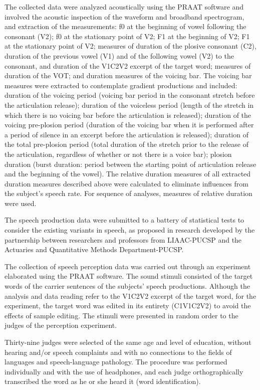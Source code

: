 The collected data were analyzed acoustically using the PRAAT software and
involved the acoustic inspection of the waveform and broadband spectrogram, and
extraction of the measurements: f0 at the beginning of vowel following the
consonant (V2); f0 at the stationary point of V2; F1 at the beginning of V2; F1
at the stationary point of V2; measures of duration of the plosive consonant
(C2), duration of the previous vowel (V1) and of the following vowel (V2) to
the consonant, and duration of the V1C2V2 excerpt of the target word; measures
of duration of the VOT; and duration measures of the voicing bar. The voicing
bar measures were extracted to contemplate gradient productions and included:
duration of the voicing period (voicing bar period in the consonant stretch
before the articulation release); duration of the voiceless period (length of
the stretch in which there is no voicing bar before the articulation is
released); duration of the voicing pre-plosion period (duration of the voicing
bar when it is performed after a period of silence in an excerpt before the
articulation is released); duration of the total pre-plosion period (total
duration of the stretch prior to the release of the articulation, regardless of
whether or not there is a voice bar); plosion duration (burst duration: period
between the starting point of articulation release and the beginning of the
vowel). The relative duration measures of all extracted duration measures
described above were calculated to eliminate influences from the subject's
speech rate. For sequence of analyses, measures of relative duration were used.

The speech production data were submitted to a battery of statistical tests to
consider the existing variants in speech, as proposed in research developed by
the partnership between researchers and professors from LIAAC-PUCSP and the
Actuaries and Quantitative Methods Department-PUCSP.

The collection of speech perception data was carried out through an experiment
elaborated using the PRAAT software. The sound stimuli consisted of the target
words of the carrier sentences of the subjects' speech productions. Although
the analysis and data reading refer to the V1C2V2 excerpt of the target word,
for the experiment, the target word was edited in its entirety (C1V1C2V2) to
avoid the effects of sample editing. The stimuli were presented in random order
to the judges of the perception experiment.

Thirty-nine judges were selected of the same age and level of education,
without hearing and/or speech complaints and with no connections to the fields
of languages and speech-language pathology. The procedure was performed
individually and with the use of headphones, and each judge orthographically
transcribed the word as he or she heard it (word identification).

